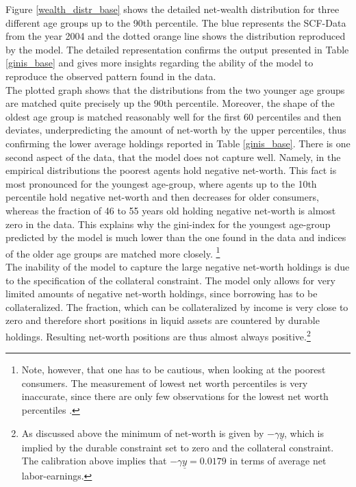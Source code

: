 \documentclass[a4paper,12pt,legno]{article}
\begin{document}
Figure \ref{wealth_distr_base} shows the detailed net-wealth distribution for three different age groups up to the 90th percentile. The blue represents the SCF-Data from the year 2004 and the dotted orange line shows the distribution reproduced by the model. The detailed representation confirms the output presented in Table \ref{ginis_base} and gives more insights regarding the ability of the model to reproduce the observed pattern found in the data. \\ 
The plotted graph shows that the distributions from the two younger age groups are matched quite precisely up the 90th percentile. Moreover, the shape of the oldest age group is matched reasonably well for the first 60 percentiles and then deviates, underpredicting the amount of net-worth by the upper percentiles, thus confirming the lower average holdings reported in Table \ref{ginis_base}. There is one second aspect of the data, that the model does not capture well. Namely, in the empirical distributions the poorest agents hold negative net-worth. This fact is most pronounced for the youngest age-group, where agents up to the 10th percentile hold negative net-worth and then decreases for older consumers, whereas the fraction of 46 to 55 years old holding negative net-worth is almost zero in the data. This explains why the gini-index for the youngest age-group predicted by the model is much lower than the one found in the data and indices of the older age groups are matched more closely. \footnote{Note, however, that one has to be cautious, when looking at the poorest consumers. The measurement of lowest net worth percentiles is very inaccurate, since there are only few observations for the lowest net worth percentiles \citep{hintermaier2011}.} 
\\ The inability of the model to capture the large negative net-worth holdings is due to the specification of the collateral constraint. The model only allows for very limited amounts of negative net-worth holdings, since borrowing has to be collateralized. The fraction, which can be collateralized by income is very close to zero and therefore short positions in liquid assets are countered by durable holdings. Resulting net-worth positions are thus almost always positive.\footnote{As discussed above the minimum of net-worth is given by $-\gamma\underline{y}$, which is implied by the durable constraint set to zero and the collateral constraint. The calibration above implies that $-\gamma\underline{y} = 0.0179$ in terms of average net labor-earnings.} 
\end{document}
